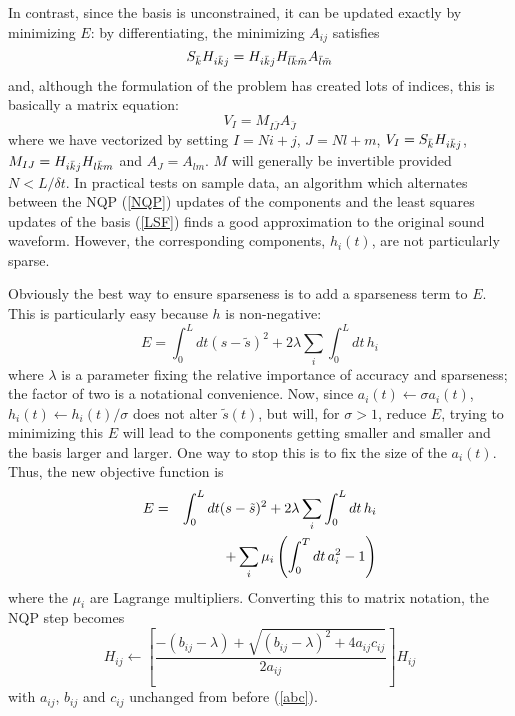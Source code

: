 \documentclass[11pt,twocolumn]{IEEEtran}
\begin{document}
In contrast, since the basis is unconstrained, it can be updated
exactly by minimizing $E$: by differentiating, the minimizing $A_{ij}$
satisfies
\begin{equation}
S_{\bar{k}} H_{i{\bar{k}} j}=H_{i{\bar{k}} j}H_{{\bar{l}}{\bar{k}}{\bar{m}}}A_{{\bar{l}}{\bar{m}}}
\label{NQP}
\end{equation}
and, although the formulation of the problem has created lots of indices, this is basically a matrix equation:
\begin{equation}
V_I=M_{I\bar{J}}A_{\bar{J}}
\label{LSF}
\end{equation}
where we have vectorized by setting $I=Ni+j$, $J=Nl+m$, $V_I=S_{\bar{k}}
H_{i{\bar{k}} j}$, $M_{IJ}=H_{i{\bar{k}} j}H_{ l{\bar{k}} m}$ and $A_J=A_{lm}$. $M$ will
generally be invertible provided $N<L/\delta t$. In practical tests on
sample data, an algorithm which alternates between the NQP (\ref{NQP}) updates of
the components and the least squares updates of the basis (\ref{LSF})
finds a good approximation to the original sound waveform. However, the
corresponding components, $h_i(t)$, are not particularly sparse.

Obviously the best way to ensure sparseness is to add a sparseness
term to $E$. This is particularly easy because $h$ is non-negative:
\begin{equation}
E=\int_0^L dt(s-\tilde{s})^2+2\lambda\sum_i\int_0^Ldt\, h_i
\end{equation}
where $\lambda$ is a parameter fixing the relative importance of
accuracy and sparseness; the factor of two is a notational
convenience. Now, since $a_i(t)\leftarrow \sigma a_i(t)$,
$h_i(t)\leftarrow h_i(t)/\sigma$ does not alter $\tilde{s}(t)$, but
will, for $\sigma>1$, reduce $E$, trying to minimizing this $E$ will
lead to the components getting smaller and smaller and the basis
larger and larger. One way to stop this is to fix the size of the
$a_i(t)$. Thus, the new objective function is
\begin{eqnarray}\label{E}
E&=&\int_0^L dt(s-\tilde{s})^2+2\lambda\sum_i\int_0^Ldt\,h_i\cr
&&+\sum_i\mu_i\left(\int_0^T dt\, a_i^2-1\right)
\end{eqnarray}
where the $\mu_i$ are Lagrange multipliers. Converting
this to matrix notation, the NQP step becomes
\begin{equation}\label{Hupdate}
H_{ij}\leftarrow\left[\frac{-(b_{ij}-\lambda)+\sqrt{(b_{ij}-\lambda)^2+4a_{ij}c_{ij}}}{2a_{ij}}\right]H_{ij}
\end{equation}
with $a_{ij}$, $b_{ij}$ and $c_{ij}$ unchanged from before (\ref{abc}).
\end{document}
